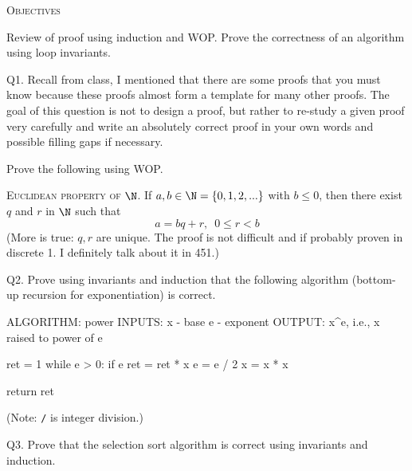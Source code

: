 


\renewcommand\TITLE{Assignment 3}


\topmatter

\textsc{Objectives}
\begin{itemize}
  \li Review of proof using induction and WOP. 
  \li Prove the correctness of an algorithm using loop invariants.
\end{itemize}


\newpage
Q1.
Recall from class, I mentioned that there are some proofs
that you must know because these proofs almost form a template for many other
proofs.
The goal of this question is not to design a proof,
but rather to re-study a given proof very carefully and write an absolutely
correct proof in your own words and possible filling gaps if necessary.

Prove the following using WOP.

\textsc{Euclidean property of $\N$.}
If $a, b \in \N = \{0, 1, 2, ...\}$ with $b \leq 0$,
then there exist $q$ and $r$ in $\N$ such that
\[
a = bq + r, \,\,\, 0 \leq r < b
\]
(More is true: $q,r$ are unique. The proof is not difficult
and if probably proven in discrete 1. I definitely talk about it in 451.)

\SOLUTION



\newpage
Q2. Prove using invariants and induction that the following algorithm
(bottom-up recursion for exponentiation) is
correct.
\begin{console}
ALGORITHM: power
INPUTS: x - base
        e - exponent
OUTPUT: x^e, i.e., x raised to power of e

ret = 1
while e > 0:
    if e %
        ret = ret * x
    e = e / 2
    x = x * x
    
return ret
\end{console}
(Note: \texttt{/} is integer division.)

\SOLUTION



\newpage
Q3.
Prove that the selection sort algorithm is correct using invariants
and induction.

\SOLUTION





